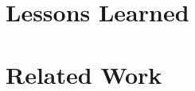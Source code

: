\documentclass[sigconf]{acmart}
\begin{document}
\section{Lessons Learned}
\textcolor{blue}{\Blindtext}


\section{Related Work}
\cite{Hills:2013:ESP:2483760.2483786}
\cite{wassermann2007sound,minamide2005static}
\textcolor{blue}{\blindtext\blindtext}

\newpage

 
\end{document}
